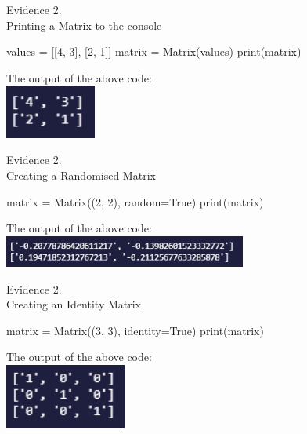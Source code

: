 \begin{center}
    {\large Evidence 2.\rn } \\ 
    \vspace{0.3cm}
    Printing a Matrix to the console \\
    \begin{pythoncode}
values = [[4, 3],
        [2, 1]]
matrix = Matrix(values)
print(matrix)
    \end{pythoncode}
    The output of the above code: \\
    \includegraphics[width=3cm]{Images/Testing/T2.4.1.PNG} \\
    \vspace{1cm}

    {\large Evidence 2.\rn } \\ 
    \vspace{0.3cm}
    Creating a Randomised Matrix \\
    \begin{pythoncode}
matrix = Matrix((2, 2), random=True)
print(matrix)
    \end{pythoncode}
    The output of the above code: \\
    \includegraphics[width=8cm]{Images/Testing/T2.5.1.PNG} \\
    \vspace{1cm}

    {\large Evidence 2.\rn } \\ 
    \vspace{0.3cm}
    Creating an Identity Matrix \\
    \begin{pythoncode}
matrix = Matrix((3, 3), identity=True)
print(matrix)
    \end{pythoncode}
    The output of the above code: \\
    \includegraphics[width=4cm]{Images/Testing/T2.6.1.PNG} \\
    \vspace{1cm}


\end{center}
